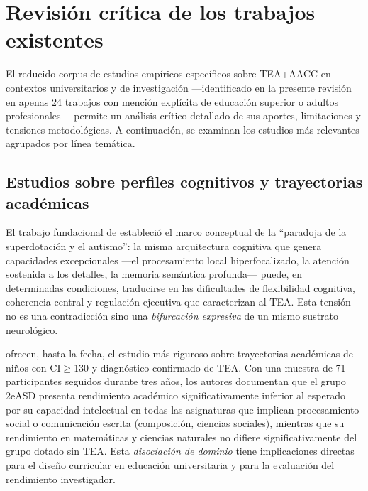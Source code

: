 %

\section{Revisión crítica de los trabajos existentes}
\label{sec:critica}

El reducido corpus de estudios empíricos específicos sobre TEA+AACC en contextos
universitarios y de investigación —identificado en la presente revisión en apenas
24 trabajos con mención explícita de educación superior o adultos profesionales—
permite un análisis crítico detallado de sus aportes, limitaciones y tensiones
metodológicas. A continuación, se examinan los estudios más relevantes agrupados
por línea temática.

\subsection{Estudios sobre perfiles cognitivos y trayectorias académicas}

El trabajo fundacional de \textcite{foleynicpon2011_paradox} estableció el marco
conceptual de la ``paradoja de la superdotación y el autismo'': la misma
arquitectura cognitiva que genera capacidades excepcionales —el procesamiento
local hiperfocalizado, la atención sostenida a los detalles, la memoria semántica
profunda— puede, en determinadas condiciones, traducirse en las dificultades de
flexibilidad cognitiva, coherencia central y regulación ejecutiva que caracterizan
al TEA. Esta tensión no es una contradicción sino una \textit{bifurcación
expresiva} de un mismo sustrato neurológico.

\textcite{cain2019} ofrecen, hasta la fecha, el estudio más riguroso sobre
trayectorias académicas de niños con CI$\geq$130 y diagnóstico confirmado de TEA.
Con una muestra de 71 participantes seguidos durante tres años, los autores
documentan que el grupo 2eASD presenta rendimiento académico significativamente
inferior al esperado por su capacidad intelectual en todas las asignaturas que
implican procesamiento social o comunicación escrita (composición, ciencias
sociales), mientras que su rendimiento en matemáticas y ciencias naturales
no difiere significativamente del grupo dotado sin TEA. Esta \textit{disociación
de dominio} tiene implicaciones directas para el diseño curricular en educación
universitaria y para la evaluación del rendimiento investigador.

